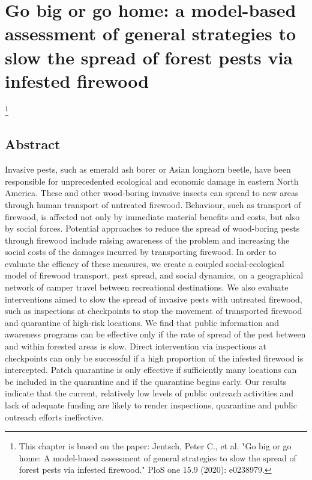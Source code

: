 \chapter{Go big or go home: a model-based assessment of general strategies to slow the spread of forest pests via infested firewood}
\label{ch2}
\let\thefootnote\relax\footnote{This chapter is based on the paper: Jentsch, Peter C., et al. "Go big or go home: A model-based assessment of general strategies to slow the spread of forest pests via infested firewood." PloS one 15.9 (2020): e0238979.}
\vspace*{0.2in}

\section{Abstract}
Invasive pests, such as emerald ash borer or Asian longhorn beetle, have been responsible for unprecedented ecological and economic damage in eastern North America. These and other wood-boring invasive insects can spread to new areas through human transport of untreated firewood. Behaviour, such as transport of firewood, is affected not only by immediate material benefits and costs, but also by social forces. Potential approaches to reduce the spread of wood-boring pests through firewood include raising awareness of the problem and increasing the social costs of the damages incurred by transporting firewood. In order to evaluate the efficacy of these measures, we create a coupled social-ecological model of firewood transport, pest spread, and social dynamics, on a geographical network of camper travel between recreational destinations. We also evaluate interventions aimed to slow the spread of invasive pests with untreated firewood, such as inspections at checkpoints to stop the movement of transported firewood and quarantine of high-risk locations. We find that public information and awareness programs can be effective only if the rate of spread of the pest between and within forested areas is slow. Direct intervention via inspections at checkpoints can only be successful if a high proportion of the infested firewood is intercepted. Patch quarantine is only effective if sufficiently many locations can be included in the quarantine and if the quarantine begins early. Our results indicate that the current, relatively low levels of public outreach activities and lack of adequate funding are likely to render inspections, quarantine and public outreach efforts ineffective.


